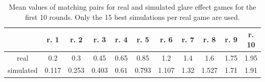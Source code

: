 \begin{table}[H]
	\centering
	\begin{tabular}{|c|c|c|c|c|c|c|c|c|c|c|}
		\hline
		& r. 1   &  r. 2  & r. 3 & r. 4   &  r. 5  & r. 6& r. 7   &  r. 8  & r. 9	&	r. 10\\
		\hline
		real&0.2 &0.3	&  0.45  &  0.65   &0.85 &  1.2   &    1.4 & 1.6 &  1.75 &1.95	\\
		\hline
		simulated&0.117 &0.253 &	0.403 &0.61  & 0.793 & 1.107& 1.32 & 1.527 & 1.71 & 1.91		\\
		\hline
	\end{tabular}
	\caption[Tabelle kurz]{Mean values of matching pairs for real and simulated glare effect games for the first 10 rounds. Only the 15 best simulations per real game are used.}
	\label{tab:small_difference}
\end{table}



